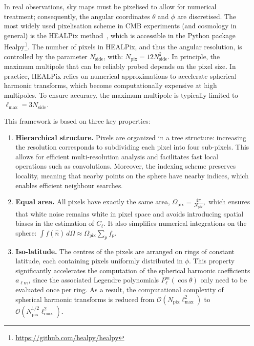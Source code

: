 \documentclass[../../thesis.tex]{subfiles}
\begin{document}
In real observations, sky maps must be pixelised to allow for numerical treatment; consequently, the angular coordinates $\theta$ and $\phi$ are discretised. The most widely used pixelisation scheme in CMB experiments (and cosmology in general) is the HEALPix method~\cite{healpix2005}, which is accessible in the Python package Healpy\footnote{\url{https://github.com/healpy/healpy}}. The number of pixels in HEALPix, and thus the angular resolution, is controlled by the parameter $N_{\mathrm{side}}$, with: $N_{\mathrm{pix}} = 12 N_{\mathrm{side}}^2.$
In principle, the maximum multipole that can be reliably probed depends on the pixel size. In practice, HEALPix relies on numerical approximations to accelerate spherical harmonic transforms, which become computationally expensive at high multipoles. To ensure accuracy, the maximum multipole is typically limited to $\ell_{\max} = 3 N_{\mathrm{side}}$.

This framework is based on three key properties:

\begin{enumerate}
\item \textbf{Hierarchical structure.} Pixels are organized in a tree structure: increasing the resolution corresponds to subdividing each pixel into four sub-pixels. This allows for efficient multi-resolution analysis and facilitates fast local operations such as convolutions. Moreover, the indexing scheme preserves locality, meaning that nearby points on the sphere have nearby indices, which enables efficient neighbour searches.

\item \textbf{Equal area.} All pixels have exactly the same area, $\Omega_{\mathrm{pix}} = \frac{4\pi}{N_{\mathrm{pix}}},$ which ensures that white noise remains white in pixel space and avoids introducing spatial biases in the estimation of $C_{\ell}$. It also simplifies numerical integrations on the sphere: $\int f(\hat{n})\, d\Omega \approx \Omega_{\mathrm{pix}} \sum_{p} f_{p}.$

\item \textbf{Iso-latitude.} The centres of the pixels are arranged on rings of constant latitude, each containing pixels uniformly distributed in $\phi$. This property significantly accelerates the computation of the spherical harmonic coefficients $a_{\ell m}$, since the associated Legendre polynomials $P_\ell^m(\cos\theta)$ only need to be evaluated once per ring. As a result, the computational complexity of spherical harmonic transforms is reduced from $\mathcal{O}(N_{\mathrm{pix}}\ell_{\max}^2)$ to $\mathcal{O}(N_{\mathrm{pix}}^{1/2}\ell_{\max}^2)$.
\end{enumerate}
\end{document}
